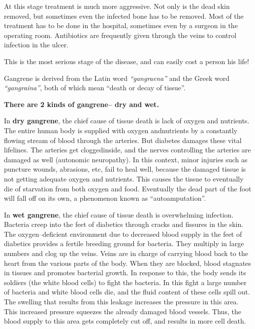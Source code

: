 At this stage treatment is much more aggressive. Not only is the dead skin removed, but sometimes even the infected bone has to be removed. Most of the treatment has to be done in the hospital, sometimes even by a surgeon in the operating room. Antibiotics are frequently given through the veins to control infection in the ulcer.


This is the most serious stage of the disease, and can easily cost a person his life!

Gangrene is derived from the Latin word \textit{“gangraena”} and the Greek word \textit{“gangraina”}, both of which mean “death or decay of tissue”.

\noindent\textbf{There are 2 kinds of gangrene– dry and wet.}

In \textbf{dry gangrene}, the chief cause of tissue death is lack of oxygen and nutrients. The entire human body is supplied with oxygen and\break nutrients by a constantly flowing stream of blood through the arte\-ries. But diabetes damages these vital lifelines. The arteries get clogged\break inside, and the nerves controlling the arteries are damaged as well (auto\-nomic neuropathy). In this context, minor injuries such as pun\-cture wounds, abrasions, etc, fail to heal well, because the damaged tissue is not getting adequate oxygen and nutrients. This causes the tissue to eve\-ntually die of starvation from both oxygen and food. Eventually the dead part of the foot will fall off on its own, a phenomenon known as “autoamputation”.

In \textbf{wet gangrene}, the chief cause of tissue death is overwhel\-ming infection. Bacteria creep into the feet of diabetics through cracks and fissures in the skin. The oxygen–deficient environment due to decrea\-sed blood supply in the feet of diabetics provides a fertile breeding ground for bacteria. They multiply in large numbers and clog up the veins. Veins are in charge of carrying blood back to the heart from the various parts of the body. When they are blocked, blood stagnates in tissues and promotes bacterial growth. In response to this, the body sends its soldiers (the white blood cells) to fight the bacteria. In this fight a large number of bacteria and white blood cells die, and the fluid content of these cells spill out. The swelling that results from this leakage increases the pressure in this area. This increased pressure squeezes the already damaged blood vessels. Thus, the blood supply to this area gets completely cut off, and results in more cell death.

